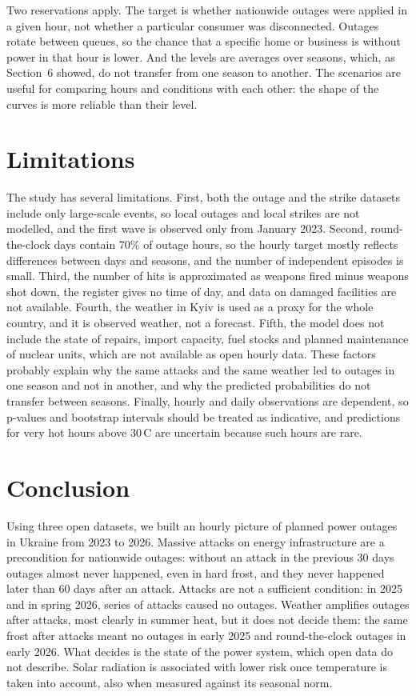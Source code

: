 \documentclass[9pt,twocolumn,letterpaper]{extarticle}
\begin{document}
Two reservations apply. The target is whether nationwide outages were applied in a given hour, not whether a particular consumer was disconnected. Outages rotate between queues, so the chance that a specific home or business is without power in that hour is lower. And the levels are averages over seasons, which, as Section~6 showed, do not transfer from one season to another. The scenarios are useful for comparing hours and conditions with each other: the shape of the curves is more reliable than their level.

\FloatBarrier
\section{Limitations}
The study has several limitations. First, both the outage and the strike datasets include only large-scale events, so local outages and local strikes are not modelled, and the first wave is observed only from January 2023. Second, round-the-clock days contain 70\% of outage hours, so the hourly target mostly reflects differences between days and seasons, and the number of independent episodes is small. Third, the number of hits is approximated as weapons fired minus weapons shot down, the register gives no time of day, and data on damaged facilities are not available. Fourth, the weather in Kyiv is used as a proxy for the whole country, and it is observed weather, not a forecast. Fifth, the model does not include the state of repairs, import capacity, fuel stocks and planned maintenance of nuclear units, which are not available as open hourly data. These factors probably explain why the same attacks and the same weather led to outages in one season and not in another, and why the predicted probabilities do not transfer between seasons. Finally, hourly and daily observations are dependent, so p-values and bootstrap intervals should be treated as indicative, and predictions for very hot hours above 30\,\textdegree C are uncertain because such hours are rare.

\section{Conclusion}
Using three open datasets, we built an hourly picture of planned power outages in Ukraine from 2023 to 2026. Massive attacks on energy infrastructure are a precondition for nationwide outages: without an attack in the previous 30 days outages almost never happened, even in hard frost, and they never happened later than 60 days after an attack. Attacks are not a sufficient condition: in 2025 and in spring 2026, series of attacks caused no outages. Weather amplifies outages after attacks, most clearly in summer heat, but it does not decide them: the same frost after attacks meant no outages in early 2025 and round-the-clock outages in early 2026. What decides is the state of the power system, which open data do not describe. Solar radiation is associated with lower risk once temperature is taken into account, also when measured against its seasonal norm.
\end{document}
